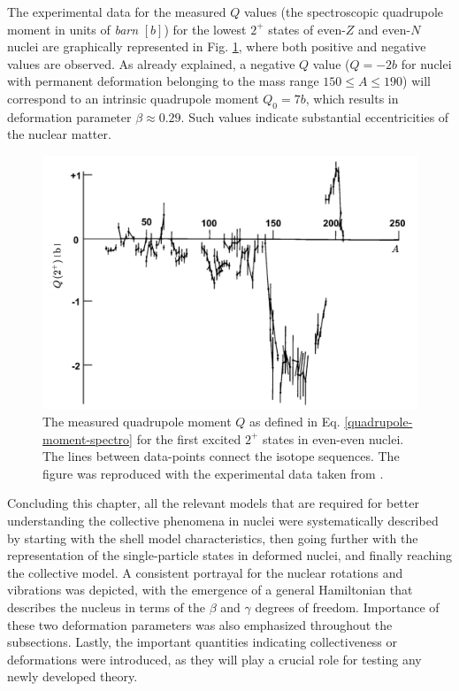 The experimental data for the measured $Q$ values (the spectroscopic quadrupole moment in units of \emph{barn} $[b]$) for the lowest $2^+$ states of even-$Z$ and even-$N$ nuclei are graphically represented in Fig. \ref{experimental-quadrupole-2Plus-states}, where both positive and negative values are observed. As already explained, a negative $Q$ value ($Q=-2b$ for nuclei with permanent deformation belonging to the mass range $150\leq A \leq 190$) will correspond to an intrinsic quadrupole moment $Q_0=7b$, which results in deformation parameter $\beta\approx 0.29$. Such values indicate substantial eccentricities of the nuclear matter.
\begin{figure}
    \centering
    \includegraphics[scale=0.3]{Chapters/Figures/2Plus_spectroscopicQ.pdf}
    \caption{The measured quadrupole moment $Q$ as defined in Eq. \ref{quadrupole-moment-spectro} for the first excited $2^+$ states in even-even nuclei. The lines between data-points connect the isotope sequences. The figure was reproduced with the experimental data taken from \cite{krane1991introductory}.}
    \label{experimental-quadrupole-2Plus-states}
\end{figure}

Concluding this chapter, all the relevant models that are required for better understanding the collective phenomena in nuclei were systematically described by starting with the shell model characteristics, then going further with the representation of the single-particle states in deformed nuclei, and finally reaching the collective model. A consistent portrayal for the nuclear rotations and vibrations was depicted, with the emergence of a general Hamiltonian that describes the nucleus in terms of the $\beta$ and $\gamma$ degrees of freedom. Importance of these two deformation parameters was also emphasized throughout the subsections. Lastly, the important quantities indicating collectiveness or deformations were introduced, as they will play a crucial role for testing any newly developed theory.